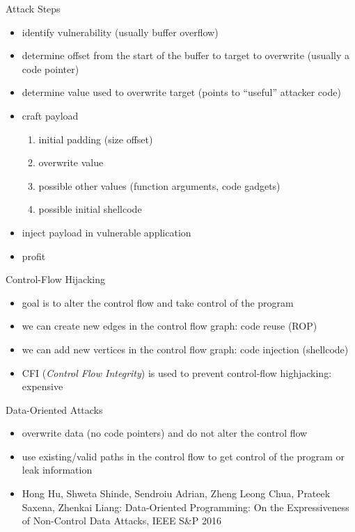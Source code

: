 \documentclass{curs}
\begin{document}
\begin{frame}{Attack Steps}
  \begin{itemize}
    \pause \item identify vulnerability (usually buffer overflow)
    \pause \item determine offset from the start of the buffer to target to overwrite (usually a code pointer)
    \pause \item determine value used to overwrite target (points to ``useful'' attacker code)
    \pause \item craft payload
      \begin{enumerate}
        \pause \item initial padding (size offset)
        \pause \item overwrite value
        \pause \item possible other values (function arguments, code gadgets)
        \pause \item possible initial shellcode
      \end{enumerate}
    \pause \item inject payload in vulnerable application
    \pause \item profit
  \end{itemize}
\end{frame}

\begin{frame}{Control-Flow Hijacking}
  \begin{itemize}
    \pause \item goal is to alter the control flow and take control of the program
    \pause \item we can create new edges in the control flow graph: code reuse (ROP)
    \pause \item we can add new vertices in the control flow graph: code injection (shellcode)
    \pause \item CFI (\textit{Control Flow Integrity}) is used to prevent control-flow highjacking: expensive
  \end{itemize}
\end{frame}

\begin{frame}{Data-Oriented Attacks}
  \begin{itemize}
    \pause \item overwrite data (no code pointers) and do not alter the control flow
    \pause \item use existing/valid paths in the control flow to get control of the program or leak information
    \pause \item Hong Hu, Shweta Shinde, Sendroiu Adrian, Zheng Leong Chua, Prateek Saxena, Zhenkai Liang: Data-Oriented Programming: On the Expressiveness of Non-Control Data Attacks, IEEE S\&P 2016
  \end{itemize}
\end{frame}
\end{document}

